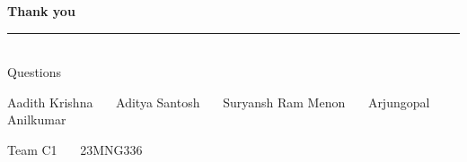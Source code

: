 \documentclass[aspectratio=169,10pt]{beamer}
\begin{document}
\begin{frame}[plain]
  \vspace{2.4em}
  \centering
  {\LARGE\bfseries\color{inkp}Thank you}\\[0.8em]
  {\color{rule}\rule{0.25\textwidth}{1.2pt}}\\[1.0em]
  {\color{inks}Questions}\\[1.8em]
  {\footnotesize\color{inkm}Aadith Krishna \ \textbar\ \ Aditya Santosh
   \ \textbar\ \ Suryansh Ram Menon \ \textbar\ \ Arjungopal Anilkumar\par}
  \vspace{0.4em}
  {\footnotesize\color{inkm}Team C1 \ \textbar\ \ 23MNG336\par}
\end{frame}
\end{document}
